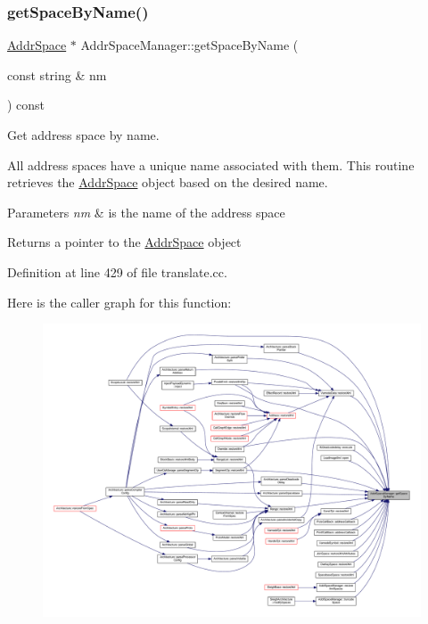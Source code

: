 \subsubsection{\texorpdfstring{getSpaceByName()}{getSpaceByName()}}
{\footnotesize\ttfamily \mbox{\hyperlink{class_addr_space}{Addr\+Space}} $\ast$ Addr\+Space\+Manager\+::get\+Space\+By\+Name (\begin{DoxyParamCaption}\item[{const string \&}]{nm }\end{DoxyParamCaption}) const}



Get address space by name. 

All address spaces have a unique name associated with them. This routine retrieves the \mbox{\hyperlink{class_addr_space}{Addr\+Space}} object based on the desired name. 
\begin{DoxyParams}{Parameters}
{\em nm} & is the name of the address space \\
\hline
\end{DoxyParams}
\begin{DoxyReturn}{Returns}
a pointer to the \mbox{\hyperlink{class_addr_space}{Addr\+Space}} object 
\end{DoxyReturn}


Definition at line 429 of file translate.\+cc.

Here is the caller graph for this function\+:
\nopagebreak
\begin{figure}[H]
\begin{center}
\leavevmode
\includegraphics[width=350pt]{class_addr_space_manager_a24efffb904ebb1a0a541fa74cafd51fc_icgraph}
\end{center}
\end{figure}
\mbox{\label{class_addr_space_manager_aa69937486b7d2b062011ac39d5513ee3}} 
